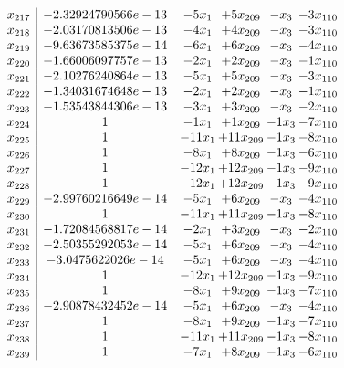 \documentclass[11pt]{article}
\begin{document}
\[\begin{array}{c| c c@{\hskip 2pt} c@{\hskip 2pt} c@{\hskip 2pt} c@{\hskip 2pt} }
 x_{217}   &  -2.32924790566e-13 & -5 x_{1} & + 5 x_{209} & - x_{3} & -3 x_{110}\\
 x_{218}   &  -2.03170813506e-13 & -4 x_{1} & + 4 x_{209} & - x_{3} & -3 x_{110}\\
 x_{219}   &  -9.63673585375e-14 & -6 x_{1} & + 6 x_{209} & - x_{3} & -4 x_{110}\\
 x_{220}   &  -1.66006097757e-13 & -2 x_{1} & + 2 x_{209} & - x_{3} & -1 x_{110}\\
 x_{221}   &  -2.10276240864e-13 & -5 x_{1} & + 5 x_{209} & - x_{3} & -3 x_{110}\\
 x_{222}   &  -1.34031674648e-13 & -2 x_{1} & + 2 x_{209} & - x_{3} & -1 x_{110}\\
 x_{223}   &  -1.53543844306e-13 & -3 x_{1} & + 3 x_{209} & - x_{3} & -2 x_{110}\\
 x_{224}   &  1 & -1 x_{1} & + 1 x_{209} & -1 x_{3} & -7 x_{110}\\
 x_{225}   &  1 & -11 x_{1} & + 11 x_{209} & -1 x_{3} & -8 x_{110}\\
 x_{226}   &  1 & -8 x_{1} & + 8 x_{209} & -1 x_{3} & -6 x_{110}\\
 x_{227}   &  1 & -12 x_{1} & + 12 x_{209} & -1 x_{3} & -9 x_{110}\\
 x_{228}   &  1 & -12 x_{1} & + 12 x_{209} & -1 x_{3} & -9 x_{110}\\
 x_{229}   &  -2.99760216649e-14 & -5 x_{1} & + 6 x_{209} & - x_{3} & -4 x_{110}\\
 x_{230}   &  1 & -11 x_{1} & + 11 x_{209} & -1 x_{3} & -8 x_{110}\\
 x_{231}   &  -1.72084568817e-14 & -2 x_{1} & + 3 x_{209} & - x_{3} & -2 x_{110}\\
 x_{232}   &  -2.50355292053e-14 & -5 x_{1} & + 6 x_{209} & - x_{3} & -4 x_{110}\\
 x_{233}   &  -3.0475622026e-14 & -5 x_{1} & + 6 x_{209} & - x_{3} & -4 x_{110}\\
 x_{234}   &  1 & -12 x_{1} & + 12 x_{209} & -1 x_{3} & -9 x_{110}\\
 x_{235}   &  1 & -8 x_{1} & + 9 x_{209} & -1 x_{3} & -7 x_{110}\\
 x_{236}   &  -2.90878432452e-14 & -5 x_{1} & + 6 x_{209} & - x_{3} & -4 x_{110}\\
 x_{237}   &  1 & -8 x_{1} & + 9 x_{209} & -1 x_{3} & -7 x_{110}\\
 x_{238}   &  1 & -11 x_{1} & + 11 x_{209} & -1 x_{3} & -8 x_{110}\\
 x_{239}   &  1 & -7 x_{1} & + 8 x_{209} & -1 x_{3} & -6 x_{110}\\

\end{array}\]
\end{document}
